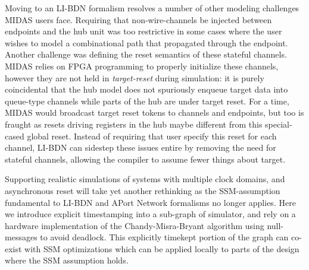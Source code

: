     Moving to an LI-BDN formalism resolves a number of other modeling
    challenges MIDAS users face.  Requiring that non-wire-channels be injected
    between endpoints and the hub unit was too restrictive in some cases where
    the user wishes to model a combinational path that propagated through the
    endpoint. Another challenge was defining the reset semantics of these
    stateful channels.  MIDAS relies on FPGA programming to properly initialize
    these channels, however they are not held in \emph{target-reset} during
    simulation: it is purely coincidental that the hub model does not
    spuriously enqueue target data into queue-type channels while parts of the
    hub are under target reset. For a time, MIDAS would broadcast target reset
    tokens to channels and endpoints, but too is fraught as resets driving
    registers in the hub maybe different from this special-cased global reset.
    Instead of requiring that user specify this reset for each channel, LI-BDN
    can sidestep these issues entire by removing the need for stateful
    channels, allowing the compiler to assume fewer things about target.

    Supporting realistic simulations of systems with multiple clock domains,
    and asynchronous reset will take yet another rethinking as the
    SSM-assumption fundamental to LI-BDN and APort Network formalisms no longer
    applies. Here we introduce explicit timestamping into a sub-graph of
    simulator, and rely on a hardware implementation of the Chandy-Misra-Bryant
    algorithm using null-messages to avoid deadlock.  This explicitly timekept
    portion of the graph can co-exist with SSM optimizations which can be
    applied locally to parts of the design where the SSM assumption holds.

